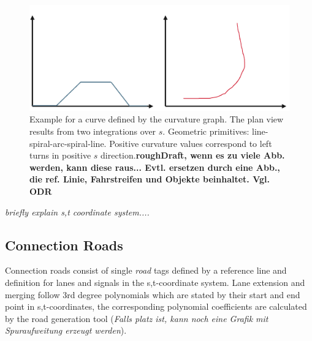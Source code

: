 \documentclass[a4paper, 10pt, conference]{ieeeconf}      %
\begin{document}
\begin{figure}%
	\centering
	\includegraphics{fig/curvGraph.pdf}
	\caption{Example for a curve defined by the curvature graph. The plan view results from two integrations over $s$. Geometric primitives: line-spiral-arc-spiral-line. Positive curvature values correspond to left turns in positive $s$ direction.\textbf{roughDraft, wenn es zu viele Abb. werden, kann diese raus... Evtl. ersetzen durch eine Abb., die ref. Linie, Fahrstreifen und Objekte beinhaltet. Vgl. ODR}}
	\label{fig_curvGraph}
\end{figure}
\textit{briefly explain s,t coordinate system....}

\subsection{Connection Roads}
Connection roads consist of single \textit{road} tags defined by a reference line and definition for lanes and signals in the s,t-coordinate system. Lane extension and merging follow 3rd degree polynomials which are stated by their start and end point in s,t-coordinates, the corresponding polynomial coefficients are calculated by the road generation tool (\textit{Falls platz ist, kann noch eine Grafik mit Spuraufweitung erzeugt werden}).
\end{document}
